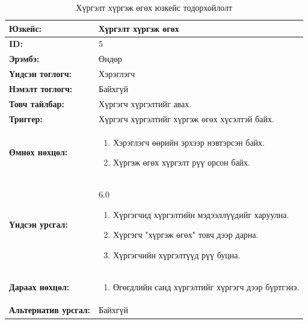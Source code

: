 \begin{table}[H]
    \caption{Хүргэлт хүргэж өгөх юзкейс тодорхойлолт}
    \begin{tabular}{|l|p{9cm}|}
		\hline
		{\bfseries Юзкейс:} & Хүргэлт хүргэж өгөх \\\hline
		{\bfseries ID:} & 5 \\\hline
		{\bfseries Эрэмбэ:} & Өндөр \\\hline
		{\bfseries Үндсэн тоглогч:} & Хэрэглэгч \\\hline
		{\bfseries Нэмэлт тоглогч:} & Байхгүй \\\hline
		{\bfseries Товч тайлбар:} & Хүргэгч хүргэлтийг авах.\\\hline
		{\bfseries Триггер:} & Хүргэгч хүргэлтийг хүргэж өгөх хүсэлтэй байх. \\\hline
		{\bfseries Өмнөх нөхцөл:} &
		    \begin{enumerate}[nosep]
		        \item Хэрэглэгч өөрийн эрхээр нэвтэрсэн байх.
		        \item Хүргэж өгөх хүргэлт рүү орсон байх.
		    \end{enumerate}
		\\\hline
		{\bfseries Үндсэн урсгал:} &
			6.0
			\begin{enumerate}[nosep]
			    \item Хүргэгчид хүргэлтийн мэдээллүүдийг харуулна.
			    \item Хүргэгч "хүргэж өгөх" товч дээр дарна.
			    \item Хүргэгчийн хүргэлтүүд рүү буцна.
			\end{enumerate}
		\\\hline
		{\bfseries Дараах нөхцөл:} &
		    \begin{enumerate}[nosep]
		        \item Өгөгдлийн санд хүргэлтийг хүргэгч дээр бүртгэнэ.
		    \end{enumerate}
		\\\hline
		{\bfseries Альтернатив урсгал:} & Байхгүй
		\\\hline
    \end{tabular}
\end{table}

